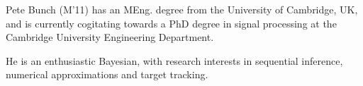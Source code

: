 \begin{IEEEbiography}{Pete Bunch} (M'11) has an MEng. degree from the University of Cambridge, UK, and is currently cogitating towards a PhD degree in signal processing at the Cambridge University Engineering Department.

He is an enthusiastic Bayesian, with research interests in sequential inference, numerical approximations and target tracking.
\end{IEEEbiography}